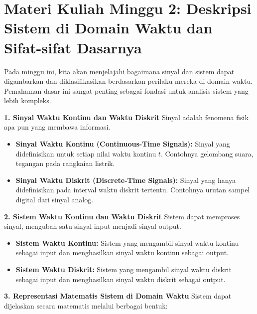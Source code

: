 \documentclass[
  letterpaper,
  DIV=11,
  numbers=noendperiod]{scrreprt}
\providecommand{\tightlist}{%
  \setlength{\itemsep}{0pt}\setlength{\parskip}{0pt}}
\begin{document}

\chapter{Materi Kuliah Minggu 2: Deskripsi Sistem di Domain Waktu dan
Sifat-sifat
Dasarnya}\label{materi-kuliah-minggu-2-deskripsi-sistem-di-domain-waktu-dan-sifat-sifat-dasarnya}

Pada minggu ini, kita akan menjelajahi bagaimana sinyal dan sistem dapat
digambarkan dan diklasifikasikan berdasarkan perilaku mereka di domain
waktu. Pemahaman dasar ini sangat penting sebagai fondasi untuk analisis
sistem yang lebih kompleks.

\textbf{1. Sinyal Waktu Kontinu dan Waktu Diskrit} Sinyal adalah
fenomena fisik apa pun yang membawa informasi.

\begin{itemize}
\tightlist
\item
  \textbf{Sinyal Waktu Kontinu (Continuous-Time Signals):} Sinyal yang
  didefinisikan untuk setiap nilai waktu kontinu \(t\). Contohnya
  gelombang suara, tegangan pada rangkaian listrik.
\item
  \textbf{Sinyal Waktu Diskrit (Discrete-Time Signals):} Sinyal yang
  hanya didefinisikan pada interval waktu diskrit tertentu. Contohnya
  urutan sampel digital dari sinyal analog.
\end{itemize}

\textbf{2. Sistem Waktu Kontinu dan Waktu Diskrit} Sistem dapat
memproses sinyal, mengubah satu sinyal input menjadi sinyal output.

\begin{itemize}
\tightlist
\item
  \textbf{Sistem Waktu Kontinu:} Sistem yang mengambil sinyal waktu
  kontinu sebagai input dan menghasilkan sinyal waktu kontinu sebagai
  output.
\item
  \textbf{Sistem Waktu Diskrit:} Sistem yang mengambil sinyal waktu
  diskrit sebagai input dan menghasilkan sinyal waktu diskrit sebagai
  output.
\end{itemize}

\textbf{3. Representasi Matematis Sistem di Domain Waktu} Sistem dapat
dijelaskan secara matematis melalui berbagai bentuk:
\end{document}
